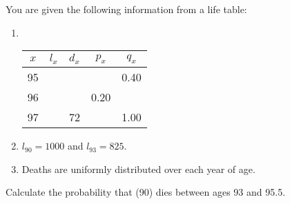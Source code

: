 You are given the following information from a life table:
\begin{enumerate}
\item \ \\ \begin{center}\begin{tabular}{|c||c|c|c|c|} \hline $x$ & $l_x$                   & $d_x$                & $p_x$                & $q_x$ \\ \hline \hline
   \vphantom{${\displaystyle \sum_{k=0}^\infty}$}  95 & \hspace{0.8in} & \hspace{0.8in} & \hspace{0.8in} & 0.40 \\  \hline
   \vphantom{${\displaystyle \sum_{k=0}^\infty}$}  96 & \hspace{0.8in} & \hspace{0.8in} & 0.20                 & \hspace{0.8in}  \\ \hline
   \vphantom{${\displaystyle \sum_{k=0}^\infty}$}  97 & \hspace{0.8in} & 72                     &                          & 1.00  \\ \hline
\end{tabular}\end{center}
\medskip
\item $l_{90}=1000$ and $l_{93}=825$.
\item Deaths are uniformly distributed over each year of age.
\end{enumerate}  
Calculate the probability that (90) dies between ages 93 and 95.5.
